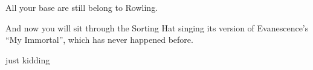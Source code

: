 All your base are still belong to Rowling.

And now you will sit through the Sorting Hat singing its version of Evanescence’s “My Immortal”, which has never happened before.

just kidding

